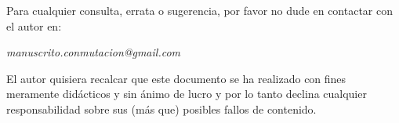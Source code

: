     \vspace*{1cm}
    Para cualquier consulta, errata o sugerencia, por favor no dude en contactar con el autor en:\newline 
    \begin{center}{\it{manuscrito.conmutacion@gmail.com}}\end{center}
    \vspace*{1cm}
    El autor quisiera recalcar que este documento se ha realizado con fines meramente didácticos y sin ánimo de lucro y por lo tanto declina cualquier responsabilidad sobre sus (más que) posibles fallos de contenido.\newline\\
    